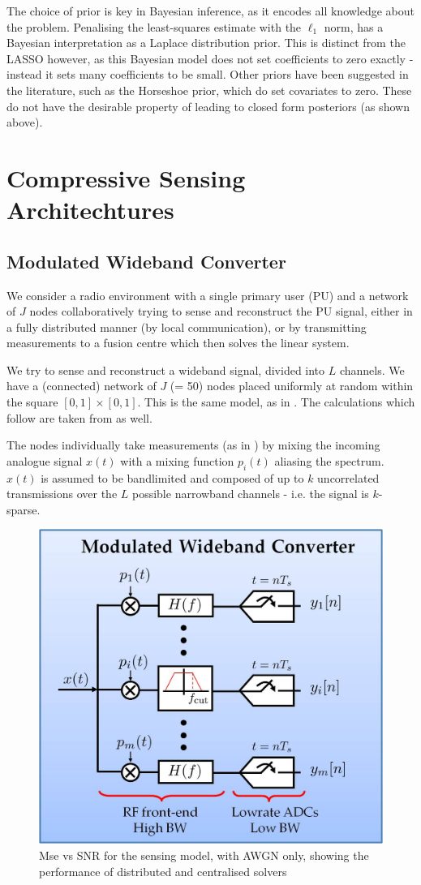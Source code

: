 \documentclass[12pt]{report}
\begin{document}
The choice of prior is key in Bayesian inference, as it encodes all knowledge about the problem. Penalising the least-squares estimate  with the \(\ell_1\) norm, has a Bayesian interpretation as a Laplace distribution prior. This is distinct from the LASSO however, as this Bayesian model does not set coefficients to zero exactly - instead it sets many coefficients to be small. Other priors have been suggested in the literature, such as the Horseshoe  prior, which do set covariates to zero. These do not have the desirable property of leading to closed form posteriors (as shown above).

\section{Compressive Sensing Architechtures}\label{sec:sensingmodel}

\subsection{Modulated Wideband Converter}
We consider a radio environment with a single primary user (PU) and a network of \(J\) nodes collaboratively trying to sense and reconstruct the PU signal, either in a fully distributed manner (by local communication), or by transmitting measurements to a fusion centre which then solves the linear system. 

We try to sense and reconstruct a wideband signal, divided into \(L\) channels. We have a (connected) network of \(J\) (= 50) nodes placed uniformly at random within the square \(  \left[0,1\right]\times \left[0,1\right] \). This is the same model, as in \cite{Zhang2011b}. The calculations which follow are taken from \cite{Zhang2011b} as well.

The nodes individually take measurements (as in \cite{mishali2010theory}) by mixing the incoming analogue signal \(x\left(t\right)\) with a mixing function \(p_i\left(t\right)\) aliasing the spectrum. \(x\left(t\right)\) is assumed to be bandlimited and composed of up to \(k\) uncorrelated transmissions over the \(L\) possible narrowband channels - i.e. the signal is \(k\)-sparse. 

\begin{figure}[h]
\centering
\includegraphics[height = 7.3 cm]{Modulated_wideband_converter.jpg}
\caption{Mse vs SNR for the sensing model, with AWGN only, showing the performance of distributed and centralised solvers}
\label{msevssnr0}
\end{figure}
\end{document}
